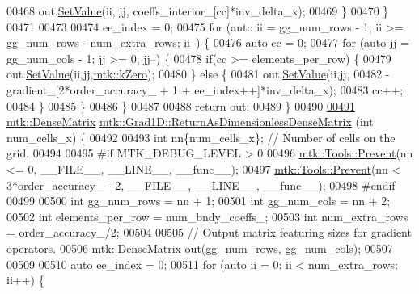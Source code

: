\begin{DoxyCode}
{{00468       out.\hyperlink{classmtk_1_1DenseMatrix_ae0f873a6d3a734da467cafb817da64ae}{SetValue}(ii, jj, coeffs\_interior\_[cc]*inv\_delta\_x);
00469     \}
00470   \}
00471 
00473 
00474   ee\_index = 0;
00475   \textcolor{keywordflow}{for} (\textcolor{keyword}{auto} ii = gg\_num\_rows - 1; ii >= gg\_num\_rows - num\_extra\_rows; ii--) \{
00476     \textcolor{keyword}{auto} cc = 0;
00477     \textcolor{keywordflow}{for} (\textcolor{keyword}{auto} jj = gg\_num\_cols - 1; jj >= 0; jj--) \{
00478       \textcolor{keywordflow}{if}(cc >= elements\_per\_row) \{
00479         out.\hyperlink{classmtk_1_1DenseMatrix_ae0f873a6d3a734da467cafb817da64ae}{SetValue}(ii,jj,\hyperlink{group__c01-roots_ga59a451a5fae30d59649bcda274fea271}{mtk::kZero});
00480       \} \textcolor{keywordflow}{else} \{
00481         out.\hyperlink{classmtk_1_1DenseMatrix_ae0f873a6d3a734da467cafb817da64ae}{SetValue}(ii,jj,
00482                      -gradient\_[2*order\_accuracy\_ + 1 + ee\_index++]*inv\_delta\_x);
00483         cc++;
00484       \}
00485      \}
00486   \}
00487 
00488   \textcolor{keywordflow}{return} out;
00489 \}
00490 
\hypertarget{mtk__grad__1d_8cc_source_l00491}{}\hyperlink{classmtk_1_1Grad1D_af857ae809aac7021116ffe2d22e4c4a5}{00491} \hyperlink{classmtk_1_1DenseMatrix}{mtk::DenseMatrix} \hyperlink{classmtk_1_1Grad1D_af857ae809aac7021116ffe2d22e4c4a5}{mtk::Grad1D::ReturnAsDimensionlessDenseMatrix}
      (\textcolor{keywordtype}{int} num\_cells\_x) \{
00492 
00493   \textcolor{keywordtype}{int} nn\{num\_cells\_x\}; \textcolor{comment}{// Number of cells on the grid.}
00494 
00495 \textcolor{preprocessor}{  #if MTK\_DEBUG\_LEVEL > 0}
00496   \hyperlink{classmtk_1_1Tools_afe5bb096309258e2e72503fd7b41c7e0}{mtk::Tools::Prevent}(nn <= 0, \_\_FILE\_\_, \_\_LINE\_\_, \_\_func\_\_);
00497   \hyperlink{classmtk_1_1Tools_afe5bb096309258e2e72503fd7b41c7e0}{mtk::Tools::Prevent}(nn < 3*order\_accuracy\_ - 2, \_\_FILE\_\_, \_\_LINE\_\_, \_\_func\_\_);
00498 \textcolor{preprocessor}{  #endif}
00499 
00500   \textcolor{keywordtype}{int} gg\_num\_rows = nn + 1;
00501   \textcolor{keywordtype}{int} gg\_num\_cols = nn + 2;
00502   \textcolor{keywordtype}{int} elements\_per\_row = num\_bndy\_coeffs\_;
00503   \textcolor{keywordtype}{int} num\_extra\_rows = order\_accuracy\_/2;
00504 
00505   \textcolor{comment}{// Output matrix featuring sizes for gradient operators.}
00506   \hyperlink{classmtk_1_1DenseMatrix}{mtk::DenseMatrix} out(gg\_num\_rows, gg\_num\_cols);
00507 
00509 
00510   \textcolor{keyword}{auto} ee\_index = 0;
00511   \textcolor{keywordflow}{for} (\textcolor{keyword}{auto} ii = 0; ii < num\_extra\_rows; ii++) \{
}}
\end{DoxyCode}
